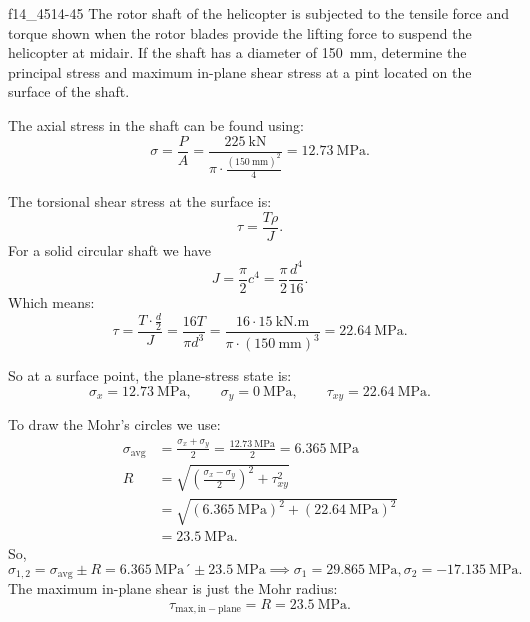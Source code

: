 
\begin{problemwithimage}{f14_45}{14-45}
  The rotor shaft of the helicopter is subjected to the tensile force and torque shown when the rotor blades provide the lifting force to suspend the helicopter at midair.
  If the shaft has a diameter of \qty{150}{\mm}, determine the principal stress and maximum in-plane shear stress at a pint located on the surface of the shaft.
\end{problemwithimage}

\begin{derivation}
  The axial stress in the shaft can be found using:
  \begin{equation*}
    \sigma = \frac{P}{A} = \frac{\qty{225}{\kN}}{\pi \cdot \frac{\left( \qty{150}{\mm}  \right)^2}{4}} = \qty{12,73}{\MPa}
  .\end{equation*}
  
  The torsional shear stress at the surface is:
  \begin{equation*}
    \tau = \frac{T\rho}{J}
  .\end{equation*}
  For a solid circular shaft we have
  \begin{equation*}
    J = \frac{\pi}{2} c^{4} = \frac{\pi}{2} \frac{d^{4 }}{16}
  .\end{equation*}
  Which means:
  \begin{equation*}
    \tau = \frac{T \cdot \frac{d}{2}}{J} = \frac{16 T}{\pi d^3} = \frac{16 \cdot \qty{15}{\kN.\m} }{\pi \cdot \left( \qty{150}{\mm}  \right)^3} = \qty{22,64}{\MPa} 
  .\end{equation*}
  
  So at a surface point, the plane-stress state is:
  \begin{equation*}
    \sigma_x = \qty{12,73}{\MPa}, \qquad \sigma_y = \qty{0}{\MPa}, \qquad \tau_{xy} = \qty{22,64}{\MPa}
  .\end{equation*}

  To draw the Mohr's circles we use:
  \begin{align*}
    \sigma_{\mathrm{avg}} &= \frac{\sigma_x + \sigma_y}{2} = \frac{\qty{12,73}{\MPa}}{2} = \qty{6,365}{\MPa} \\
    R &= \sqrt{\left( \frac{\sigma_x - \sigma_y}{2} \right)^2 + \tau_{xy}^2} \\
    &= \sqrt{\left( \qty{6.365}{\MPa}  \right)^2 + \left( \qty{22.64}{\MPa}  \right)^2} \\
    &= \qty{23,5}{\MPa} 
  .\end{align*}
  So,
  \begin{equation*}
    \sigma_{1,2} = \sigma_{\mathrm{avg}} \pm R = \qty{6,365}{\MPa} ´\pm \qty{23,5}{\MPa} \implies \sigma_1 = \qty{29,865}{\MPa}, \sigma_2 = \qty{-17,135}{\MPa} 
  .\end{equation*}
  The maximum in-plane shear is just the Mohr radius:
  \begin{equation*}
    \tau_{\mathrm{max}, \mathrm{in-plane}} = R = \qty{23,5}{\MPa} 
  .\end{equation*}
\end{derivation}

